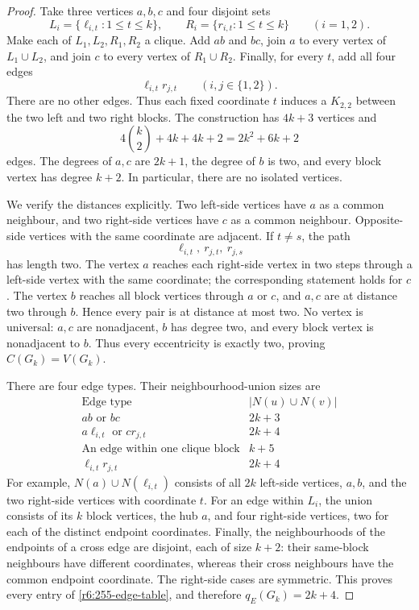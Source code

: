 \documentclass[11pt,a4paper]{article}
\theoremstyle{remark}
\begin{document}
\begin{proof}
Take three vertices $a,b,c$ and four disjoint sets
\[
 L_i=\{\ell_{i,t}:1\le t\le k\},\qquad
 R_i=\{r_{i,t}:1\le t\le k\}\qquad(i=1,2).
\]
Make each of $L_1,L_2,R_1,R_2$ a clique.  Add $ab$ and $bc$, join $a$
to every vertex of $L_1\cup L_2$, and join $c$ to every vertex of
$R_1\cup R_2$.  Finally, for every $t$, add all four edges
\begin{equation}
 \ell_{i,t}r_{j,t}\qquad(i,j\in\{1,2\}).
 \label{r6:255-cross-edges}
\end{equation}
There are no other edges.  Thus each fixed coordinate $t$ induces a
$K_{2,2}$ between the two left and two right blocks.  The construction
has $4k+3$ vertices and
\[
 4\binom{k}{2}+4k+4k+2=2k^2+6k+2
\]
edges.  The degrees of $a,c$ are $2k+1$, the degree of $b$ is two,
and every block vertex has degree $k+2$.  In particular, there are no
isolated vertices.

We verify the distances explicitly.  Two left-side vertices have $a$
as a common neighbour, and two right-side vertices have $c$ as a
common neighbour.  Opposite-side vertices with the same coordinate
are adjacent.  If $t\ne s$, the path
\[
 \ell_{i,t},\ r_{j,t},\ r_{j,s}
\]
has length two.  The vertex $a$ reaches each right-side vertex in two
steps through a left-side vertex with the same coordinate; the
corresponding statement holds for $c$.  The vertex $b$ reaches all
block vertices through $a$ or $c$, and $a,c$ are at distance two
through $b$.  Hence every pair is at distance at most two.  No vertex
is universal: $a,c$ are nonadjacent, $b$ has degree two, and every
block vertex is nonadjacent to $b$.  Thus every eccentricity is exactly
two, proving $C(G_k)=V(G_k)$.

There are four edge types.  Their neighbourhood-union sizes are
\begin{equation}
\begin{array}{l|c}
 \text{Edge type}&|N(u)\cup N(v)|\\ \hline
 ab\text{ or }bc&2k+3\\
 a\ell_{i,t}\text{ or }cr_{j,t}&2k+4\\
 \text{An edge within one clique block}&k+5\\
 \ell_{i,t}r_{j,t}&2k+4
\end{array}
\label{r6:255-edge-table}
\end{equation}
For example, $N(a)\cup N(\ell_{i,t})$ consists of all $2k$ left-side
vertices, $a,b$, and the two right-side vertices with coordinate $t$.
For an edge within $L_i$, the union consists of its $k$ block vertices,
the hub $a$, and four right-side vertices, two for each of the distinct
endpoint coordinates.  Finally, the neighbourhoods of the endpoints
of a cross edge are disjoint, each of size $k+2$: their same-block
neighbours have different coordinates, whereas their cross neighbours
have the common endpoint coordinate.  The right-side cases are
symmetric.  This proves every entry of \eqref{r6:255-edge-table}, and
therefore $q_E(G_k)=2k+4$.


\end{proof}
\end{document}
